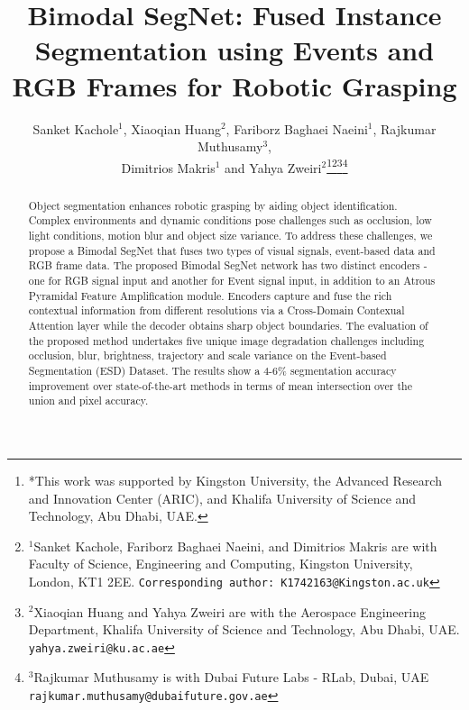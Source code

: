 \documentclass[lettersize,journal]{IEEEtran}
\begin{document}
\title{Bimodal SegNet: Fused Instance Segmentation using Events and RGB Frames for Robotic Grasping}





\author{Sanket Kachole$^{1}$, Xiaoqian Huang$^{2}$, Fariborz Baghaei Naeini$^{1}$, Rajkumar Muthusamy$^{3}$, \\ Dimitrios Makris$^{1}$ and Yahya Zweiri$^{2}$\thanks{*This work was supported by Kingston University, the Advanced Research and Innovation Center (ARIC), and Khalifa University of Science and Technology, Abu Dhabi, UAE.}\thanks{$^{1}$Sanket Kachole, Fariborz Baghaei Naeini, and Dimitrios Makris are with Faculty of Science, Engineering and Computing, Kingston University, London, KT1 2EE.
        {\tt\small Corresponding author: K1742163@Kingston.ac.uk}}\thanks{$^{2}$Xiaoqian Huang and Yahya Zweiri are with the Aerospace Engineering Department, Khalifa University of Science and Technology, Abu Dhabi, UAE.
        {\tt\small yahya.zweiri@ku.ac.ae}}\thanks{$^{3}$Rajkumar Muthusamy is with Dubai Future Labs - RLab, Dubai, UAE
        {\tt\small rajkumar.muthusamy@dubaifuture.gov.ae}}}













\maketitle



\begin{abstract}



Object segmentation enhances robotic grasping by aiding object identification. Complex environments and dynamic conditions pose challenges such as occlusion, low light conditions, motion blur and object size variance. To address these challenges, we propose a Bimodal SegNet that fuses two types of visual signals, event-based data and RGB  frame data. The proposed Bimodal SegNet network has two distinct encoders - one for RGB signal input and another for Event signal input, in addition to an Atrous Pyramidal Feature Amplification module. Encoders capture and fuse the rich contextual information from different resolutions via a Cross-Domain Contexual Attention layer while the decoder obtains sharp object boundaries. The evaluation of the proposed method undertakes five unique image degradation challenges including occlusion, blur, brightness, trajectory and scale variance on the Event-based Segmentation (ESD) Dataset. The results show a 4-6\% segmentation accuracy improvement over state-of-the-art methods in terms of mean intersection over the union and pixel accuracy.

 
 
\end{abstract}
\end{document}
